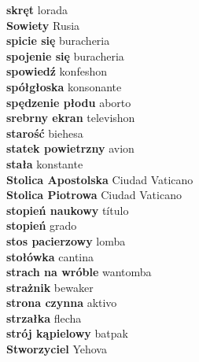 \textbf{ skręt  } lorada \\
\textbf{ Sowiety  } Rusia \\
\textbf{ spicie się  } buracheria \\
\textbf{ spojenie się  } buracheria \\
\textbf{ spowiedź  } konfeshon \\
\textbf{ spółgłoska  } konsonante \\
\textbf{ spędzenie płodu  } aborto \\
\textbf{ srebrny ekran  } televishon \\
\textbf{ starość  } biehesa \\
\textbf{ statek powietrzny  } avion \\
\textbf{ stała  } konstante \\
\textbf{ Stolica Apostolska  } Ciudad Vaticano \\
\textbf{ Stolica Piotrowa  } Ciudad Vaticano \\
\textbf{ stopień naukowy  } título \\
\textbf{ stopień  } grado \\
\textbf{ stos pacierzowy  } lomba \\
\textbf{ stołówka  } cantina \\
\textbf{ strach na wróble  } wantomba \\
\textbf{ strażnik  } bewaker \\
\textbf{ strona czynna  } aktivo \\
\textbf{ strzałka  } flecha \\
\textbf{ strój kąpielowy  } batpak \\
\textbf{ Stworzyciel  } Yehova \\

